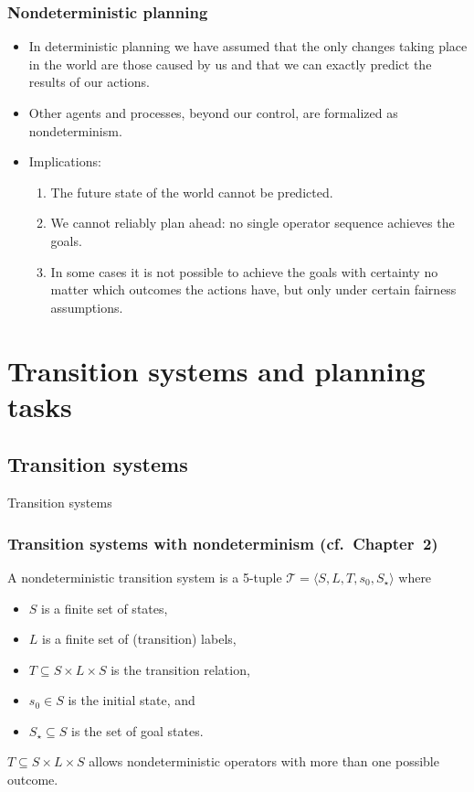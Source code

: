 \documentclass{gkibeamer}
\begin{document}
\begin{frame}
  \frametitle{Nondeterministic planning}

  \begin{itemize}
  \item In \alert{deterministic planning} we have assumed that the
    only changes taking place in the world are those caused by us and
    that we can \alert{exactly predict} the results of our actions.
  \item 
    \alert{Other agents} and processes, beyond our control,
    are formalized as \alert{nondeterminism}.
  \item
    Implications:
    \begin{enumerate}
    \item The future state of the world cannot be predicted.
    \item We cannot reliably plan ahead: no single operator sequence
      achieves the goals.
    \item In some cases it is not possible to achieve the goals with
      certainty no matter which outcomes the actions have, but only
      under certain fairness assumptions.
    \end{enumerate}
  \end{itemize}
\end{frame}

\section{Transition systems and planning tasks}

\subsection{Transition systems}

\begin{frame}{Transition systems}
  \frametitle{Transition systems with nondeterminism (cf.~Chapter~2)}
  \begin{definition}
    A \alert{nondeterministic transition system} is a 5-tuple
    $\mathcal T = \langle S, L, T, s_0, S_\star\rangle$ where
    \begin{itemize}
    \item $S$ is a finite set of \alert{states},
    \item $L$ is a finite set of (transition) \alert{labels},
    \item $T \subseteq S \times L \times S$ is the \alert{transition
      relation},
    \item $s_0 \in S$ is the \alert{initial state}, and
    \item $S_\star \subseteq S$ is the set of \alert{goal states}.
    \end{itemize}
  \end{definition}

   $T \subseteq S \times L \times S$ allows
  \alert{nondeterministic operators} with more than one possible
  outcome.
\end{frame}
\end{document}
